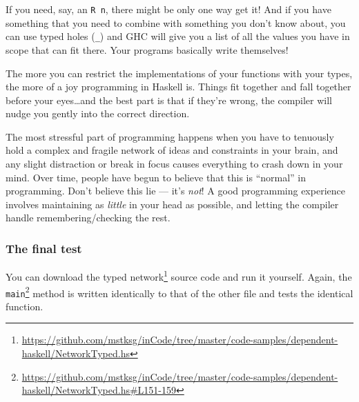 \documentclass[]{article}
\newenvironment{Shaded}{\begin{snugshade}}{\end{snugshade}}
\newcommand{\CommentTok}[1]{\textcolor[rgb]{0.56,0.35,0.01}{\textit{#1}}}
\newcommand{\ExtensionTok}[1]{#1}
\newcommand{\NormalTok}[1]{#1}
\renewcommand{\href}[2]{#2\footnote{\url{#1}}}
\begin{document}
If you need, say, an \texttt{R\ n}, there might be only one way get it! And if
you have something that you need to combine with something you don't know about,
you can use typed holes (\texttt{\_}) and GHC will give you a list of all the
values you have in scope that can fit there. Your programs basically write
themselves!

The more you can restrict the implementations of your functions with your types,
the more of a joy programming in Haskell is. Things fit together and fall
together before your eyes\ldots{}and the best part is that if they're wrong, the
compiler will nudge you gently into the correct direction.

The most stressful part of programming happens when you have to tenuously hold a
complex and fragile network of ideas and constraints in your brain, and any
slight distraction or break in focus causes everything to crash down in your
mind. Over time, people have begun to believe that this is ``normal'' in
programming. Don't believe this lie --- it's \emph{not}! A good programming
experience involves maintaining as \emph{little} in your head as possible, and
letting the compiler handle remembering/checking the rest.

\hypertarget{the-final-test}{%
\subsubsection{The final test}\label{the-final-test}}

You can download the
\href{https://github.com/mstksg/inCode/tree/master/code-samples/dependent-haskell/NetworkTyped.hs}{typed
network} source code and run it yourself. Again, the
\href{https://github.com/mstksg/inCode/tree/master/code-samples/dependent-haskell/NetworkTyped.hs\#L151-159}{\texttt{main}}
method is written identically to that of the other file and tests the identical
function.

\begin{Shaded}
\end{Shaded}
\end{document}
